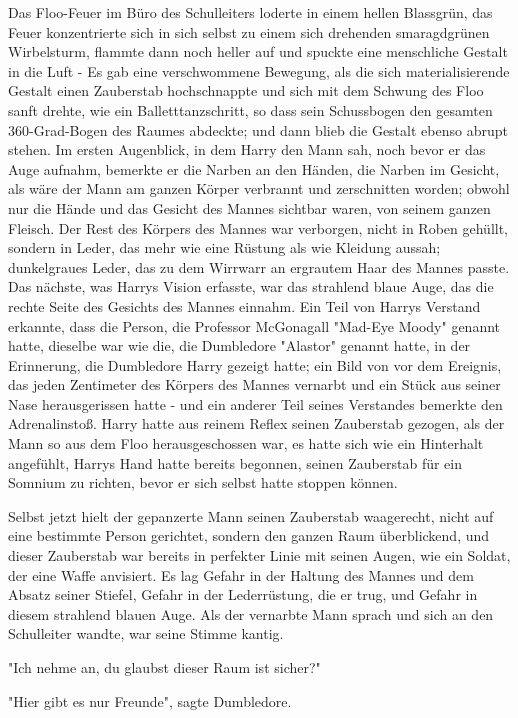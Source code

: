 {Das Floo-Feuer im Büro des Schulleiters loderte in einem hellen Blassgrün, das Feuer konzentrierte sich in sich selbst zu einem sich drehenden smaragdgrünen Wirbelsturm, flammte dann noch heller auf und spuckte eine menschliche Gestalt in die Luft - Es gab eine verschwommene Bewegung, als die sich materialisierende Gestalt einen Zauberstab hochschnappte und sich mit dem Schwung des Floo sanft drehte, wie ein Balletttanzschritt, so dass sein Schussbogen den gesamten 360-Grad-Bogen des Raumes abdeckte; und dann blieb die Gestalt ebenso abrupt stehen. Im ersten Augenblick, in dem Harry den Mann sah, noch bevor er das Auge aufnahm, bemerkte er die Narben an den Händen, die Narben im Gesicht, als wäre der Mann am ganzen Körper verbrannt und zerschnitten worden; obwohl nur die Hände und das Gesicht des Mannes sichtbar waren, von seinem ganzen Fleisch. Der Rest des Körpers des Mannes war verborgen, nicht in Roben gehüllt, sondern in Leder, das mehr wie eine Rüstung als wie Kleidung aussah; dunkelgraues Leder, das zu dem Wirrwarr an ergrautem Haar des Mannes passte. Das nächste, was Harrys Vision erfasste, war das strahlend blaue Auge, das die rechte Seite des Gesichts des Mannes einnahm. Ein Teil von Harrys Verstand erkannte, dass die Person, die Professor McGonagall "Mad-Eye Moody" genannt hatte, dieselbe war wie die, die Dumbledore "Alastor" genannt hatte, in der Erinnerung, die Dumbledore Harry gezeigt hatte; ein Bild von vor dem Ereignis, das jeden Zentimeter des Körpers des Mannes vernarbt und ein Stück aus seiner Nase herausgerissen hatte - und ein anderer Teil seines Verstandes bemerkte den Adrenalinstoß. Harry hatte aus reinem Reflex seinen Zauberstab gezogen, als der Mann so aus dem Floo herausgeschossen war, es hatte sich wie ein Hinterhalt angefühlt, Harrys Hand hatte bereits begonnen, seinen Zauberstab für ein Somnium zu richten, bevor er sich selbst hatte stoppen können.

Selbst jetzt hielt der gepanzerte Mann seinen Zauberstab waagerecht, nicht auf eine bestimmte Person gerichtet, sondern den ganzen Raum überblickend, und dieser Zauberstab war bereits in perfekter Linie mit seinen Augen, wie ein Soldat, der eine Waffe anvisiert. Es lag Gefahr in der Haltung des Mannes und dem Absatz seiner Stiefel, Gefahr in der Lederrüstung, die er trug, und Gefahr in diesem strahlend blauen Auge. Als der vernarbte Mann sprach und sich an den Schulleiter wandte, war seine Stimme kantig.

"Ich nehme an, du glaubst dieser Raum ist sicher?"

"Hier gibt es nur Freunde", sagte Dumbledore.

}
